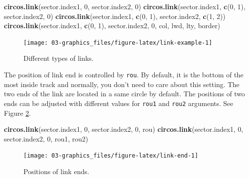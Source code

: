 \documentclass[]{book}
\newenvironment{Shaded}{\begin{snugshade}}{\end{snugshade}}
\newcommand{\KeywordTok}[1]{\textcolor[rgb]{0.13,0.29,0.53}{\textbf{#1}}}
\newcommand{\DecValTok}[1]{\textcolor[rgb]{0.00,0.00,0.81}{#1}}
\newcommand{\NormalTok}[1]{#1}
\theoremstyle{definition}
\theoremstyle{definition}
\theoremstyle{remark}
\begin{document}
\begin{Shaded}
\begin{Highlighting}[]
\KeywordTok{circos.link}\NormalTok{(sector.index1, }\DecValTok{0}\NormalTok{, sector.index2, }\DecValTok{0}\NormalTok{)}
\KeywordTok{circos.link}\NormalTok{(sector.index1, }\KeywordTok{c}\NormalTok{(}\DecValTok{0}\NormalTok{, }\DecValTok{1}\NormalTok{), sector.index2, }\DecValTok{0}\NormalTok{)}
\KeywordTok{circos.link}\NormalTok{(sector.index1, }\KeywordTok{c}\NormalTok{(}\DecValTok{0}\NormalTok{, }\DecValTok{1}\NormalTok{), sector.index2, }\KeywordTok{c}\NormalTok{(}\DecValTok{1}\NormalTok{, }\DecValTok{2}\NormalTok{))}
\KeywordTok{circos.link}\NormalTok{(sector.index1, }\KeywordTok{c}\NormalTok{(}\DecValTok{0}\NormalTok{, }\DecValTok{1}\NormalTok{), sector.index2, }\DecValTok{0}\NormalTok{, col, lwd, lty, border)}
\end{Highlighting}
\end{Shaded}

\begin{figure}

{\centering \texttt{[image: 03-graphics\_files/figure-latex/link-example-1]} 

}

\caption{Different types of links.}\label{fig:link-example}
\end{figure}

The position of link end is controlled by \texttt{rou}. By default, it
is the bottom of the most inside track and normally, you don't need to
care about this setting. The two ends of the link are located in a same
circle by default. The positions of two ends can be adjusted with
different values for \texttt{rou1} and \texttt{rou2} arguments. See
Figure \ref{fig:link-end}.

\begin{Shaded}
\begin{Highlighting}[]
\KeywordTok{circos.link}\NormalTok{(sector.index1, }\DecValTok{0}\NormalTok{, sector.index2, }\DecValTok{0}\NormalTok{, rou)}
\KeywordTok{circos.link}\NormalTok{(sector.index1, }\DecValTok{0}\NormalTok{, sector.index2, }\DecValTok{0}\NormalTok{, rou1, rou2)}
\end{Highlighting}
\end{Shaded}

\begin{figure}

{\centering \texttt{[image: 03-graphics\_files/figure-latex/link-end-1]} 

}

\caption{Positions of link ends.}\label{fig:link-end}
\end{figure}
\end{document}
